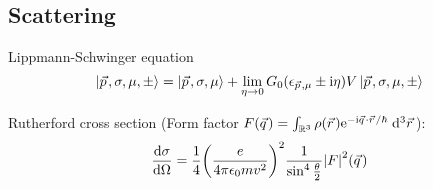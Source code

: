 	\subsection{Scattering}
		\noindent
		Lippmann-Schwinger equation
		\begin{equation}
			\Ket{\vec{p},\sigma,\mu,\pm} = \Ket{\vec{p}, \sigma, \mu} + \lim_{\eta\rightarrow 0} G_0(\epsilon_{\vec{p},\mu}\pm \i\eta) V \Ket{\vec{p},\sigma,\mu,\pm}
		\end{equation}

		\noindent
		Rutherford cross section (Form factor $F(\vec{q}) = \int_{\mathbb{R}^3} \rho(\vec{r}) \ex^{-\i \vec{q}\cdot\vec{r}/\hbar}\;\dd^3 \vec{r} $):
		\begin{equation}
			\dv{\sigma}{\Omega} = \frac{1}{4} \qty(\frac{e}{4\pi\epsilon_0 m v^2})^2
			\frac{1}{\sin^4\frac{\theta}{2}} \abs{F}^2(\vec{q})
		\end{equation}
